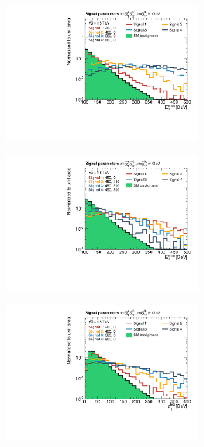 \begin{figure}
	\centering
	\begin{subfigure}[b]{0.5\linewidth}
		\centering\includegraphics[width=0.8\textwidth]{high_mass/met}
	\end{subfigure}\hfill
	\begin{subfigure}[b]{0.5\linewidth}
		\centering\includegraphics[width=0.8\textwidth]{mass_diff/met}
	\end{subfigure}\hfill
	\par\medskip
	\begin{subfigure}[b]{0.5\linewidth}
		\centering\includegraphics[width=0.8\textwidth]{high_mass/lep1Pt}

\end{subfigure}
\end{figure}
